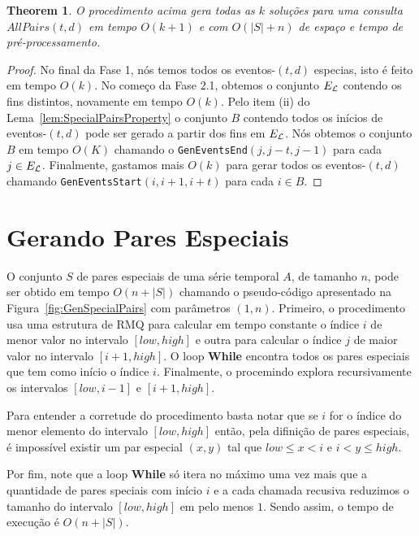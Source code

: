 \documentclass[12pt]{article}
\newtheorem{thm}{Theorem}[section]
\begin{document}
\begin{thm}
O procedimento acima gera todas as $k$ soluções para uma consulta $AllPairs(t, d)$ em tempo $O(k + 1)$
e com $O(|S| + n)$ de espaço e tempo de pré-processamento.
\end{thm}
\begin{proof}
No final da Fase 1, nós temos todos os eventos-$(t,d)$ especias,
isto é feito em tempo $O(k)$. No começo da Fase 2.1,
obtemos o conjunto $E_{\cal{L}}$ contendo os fins distintos,
novamente em tempo $O(k)$. Pelo item (ii) do Lema~\ref{lem:SpecialPairsProperty}
o conjunto $B$ contendo todos os inícios de eventos-$(t,d)$ pode ser gerado a partir
dos fins em $E_{\cal{L}}$. Nós obtemos o conjunto $B$ em tempo $O(K)$ chamando o {\tt GenEventsEnd}$(j,j-t,j-1)$
para cada $j \in E_{\cal{L}}$. Finalmente, gastamos mais $O(k)$ para gerar todos os eventos-$(t,d)$
chamando {\tt GenEventsStart}$(i,i+1,i+t)$ para cada $i \in B$.
\end{proof}


\section{Gerando Pares Especiais}

O conjunto $S$ de pares especiais de uma série temporal $A$, de tamanho $n$, pode ser obtido
em tempo $O(n + |S|)$ chamando o pseudo-código apresentado na Figura~\ref{fig:GenSpecialPairs}
com parâmetros $(1, n)$. Primeiro, o procedimento usa uma estrutura de RMQ para calcular
em tempo constante o índice $i$ de menor valor no intervalo $[low, high]$ e outra
para calcular o índice $j$ de maior valor no intervalo $[i + 1, high]$. 
O loop {\bf While} encontra todos os pares especiais que tem como início o índice $i$.
Finalmente, o procemindo explora recursivamente os intervalos $[low, i - 1]$ e $[i + 1, high]$.

Para entender a corretude do procedimento basta notar que se $i$ for o índice
do menor elemento do intervalo $[low, high]$ então, pela difinição de pares especiais,
é impossível existir um par especial $(x, y)$ tal que $low \le x < i$ e $i < y \le high$.

Por fim, note que a loop {\bf While} só itera no máximo uma vez mais que a quantidade
de pares speciais com início $i$ e a cada chamada recusiva reduzimos o tamanho do intervalo
$[low, high]$ em pelo menos $1$. Sendo assim, o tempo de execução é $O(n + |S|)$.
\end{document}
